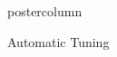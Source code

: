\documentclass{beamer}
\begin{document}
\begin{frame}[fragile]{}
\begin{columns}
\begin{column}{.245\textwidth}
\begin{beamercolorbox}[center]{postercolumn}
\begin{minipage}{.98\textwidth}
{\begin{myblock}{Automatic Tuning}
						
						
						\end{myblock}
					\vfill}
				\end{minipage}
			\end{beamercolorbox}
		\end{column}
	\end{columns}
\end{frame}
\end{document}

